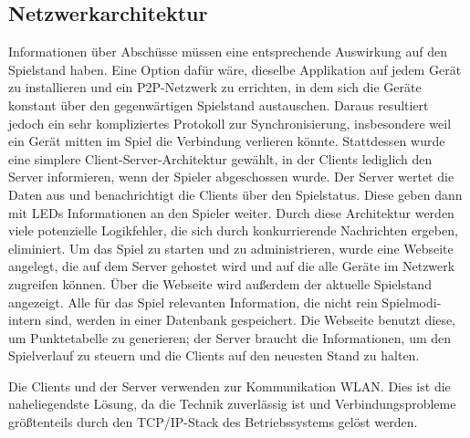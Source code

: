 \subsection{Netzwerkarchitektur}
\label{sec:architektur-netzwerkarchitektur}

Informationen über Abschüsse müssen eine entsprechende Auswirkung auf den Spielstand haben.
Eine Option dafür wäre, dieselbe Applikation auf jedem Gerät zu installieren und ein P2P-Netzwerk zu
errichten, in dem sich die Geräte konstant über den gegenwärtigen Spielstand austauschen.
Daraus resultiert jedoch ein sehr kompliziertes Protokoll zur Synchronisierung, insbesondere weil
ein Gerät mitten im Spiel die Verbindung verlieren könnte.
Stattdessen wurde eine simplere Client-Server-Architektur gewählt, in der Clients lediglich
den Server informieren, wenn der Spieler abgeschossen wurde.
Der Server wertet die Daten aus und benachrichtigt die Clients über den Spielstatus.
Diese geben dann mit LEDs Informationen an den Spieler weiter.
Durch diese Architektur werden viele potenzielle Logikfehler, die sich durch konkurrierende Nachrichten
ergeben, eliminiert. Um das Spiel zu starten und zu administrieren, wurde eine
Webseite angelegt, die auf dem Server gehostet wird und auf die alle Geräte im
Netzwerk zugreifen können. Über die Webseite wird außerdem der aktuelle
Spielstand angezeigt. Alle für das Spiel relevanten Information, die nicht
rein Spielmodi-intern sind, werden in einer Datenbank gespeichert. Die Webseite
benutzt diese, um Punktetabelle zu generieren; der Server braucht die Informationen,
um den Spielverlauf zu steuern und die Clients auf den neuesten Stand zu halten.

Die Clients und der Server verwenden zur Kommunikation WLAN. Dies ist die naheliegendste Lösung, da
die Technik zuverlässig ist und Verbindungsprobleme größtenteils durch den TCP/IP-Stack des
Betriebssystems gelöst werden.

